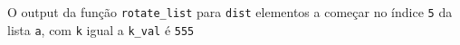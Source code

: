 \documentclass[12pt,varwidth=16cm,border=1pt]{standalone}
\begin{document}
O output da função \verb+rotate_list+ para \verb+dist+ elementos a começar no índice \verb+5+ da lista \verb+a+, com \verb+k+ igual a \verb+k_val+ é \verb+555+ 

\questiomfalse
\end{document}
